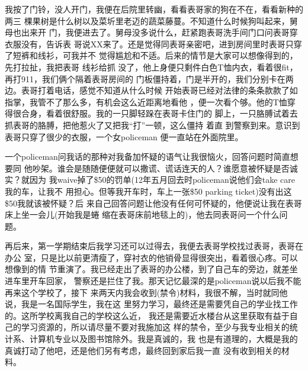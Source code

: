 \documentclass[12pt]{book}
\begin{document}
我按了门铃，没人开门，我便在后院里转幽，看看表哥家的狗在不在，看看新种的两三
棵果树是什么树以及菜圻里老迈的蔬菜藤蔓。不知道什么时候狗叫起来，舅母也出来开
门，我便进去了。舅母没多说什么，赶紧跑表哥洗手间门口问表哥穿衣服没有，告诉表
哥说XX来了。还是觉得同表哥亲密吧，进到房间里时表哥只穿了短裤和线衫，可我并不
觉得尴尬和不适。后来的情节是大家可以想像得到的，先打拉扯，我把表哥 线衫给抓
没了，他上身便只剩件白色T恤内衣，看着很fit，再打911，我们俩个隔着表哥房间的
门板僵持着，门是半开的，我们分别卡在两边。表哥打着电话，感觉不知道从什么时候
开始表哥已经对法律的条条款款了如指掌，我管不了那么多，有机会这么近距离地看他
，便一次看个够。他的T恤穿得很合身，看着很舒服。我的一只脚轻跺在表哥卡住门的
脚上，一只胳膊试着去抓表哥的胳膊，把他惹火了又把我“打”一顿，这么僵持 着直
到警察到来。意识到 表哥只穿了很少的衣服，一个女policeman 便一直站在外面院里。

一个policeman问我话的那种对我备加怀疑的语气让我很恼火，回答问题时简直想要同
他吵架。谁会是随随便便就可以撒谎、谎话连天的人？谁愿意被怀疑是否诚实？就因为
我waive掉了\$50的罚单(12年五月回去时policeman说他们会take care 我的车，让我不
用担心。但等我开车时，车上一张\$50 parking ticket)没有出这\$50我就该被怀疑？后
来自己回答问题让他没有任何可怀疑的，他便说让我在表哥床上坐一会儿(开始我是蜷
缩在表哥床前地毯上的)，他去同表哥问一个什么问题。

再后来，第一学期结束后我学习还可以过得去，我便去表哥学校找过表哥，表哥在办公
室，只是比以前更清瘦了，穿衬衣的他销骨显得很突出，看着很心疼。可以想像到的情
节重演了。我已经走出了表哥的办公楼，到了自己车的旁边，就差坐进车里开车回家，
警察还是拦住了我。那天记忆最深的是policeman说以后我不能再来这个学校了，接下
来两天内我会收到(禁令)材料，我很不解，当时就同他说，我是一名国际学生，我在这
里努力学习，最终还是需要凭自己的学业找工作的。这所学校离我自己的学校这么近，
我还是需要近水楼台从这里获取有益于自己的学习资源的，所以请尽量不要对我施加这
样的禁令，至少与我专业相关的统计系、计算机专业以及图书馆除外。我是真诚的，我
也是有道理的，大概是我的真诚打动了他吧，还是他们另有考虑，最终回到家后我一直
没有收到相关的材料。
\end{document}
